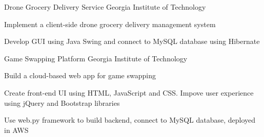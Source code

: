 


\begin{cventries}


	\compactcventry
	{Drone Grocery Delivery Service}
	{Georgia Institute of Technology} %
	{
		\begin{cvitems}
			\item{Implement a client-side drone grocery delivery management system}
			\item{Develop GUI using Java Swing and connect to MySQL database using Hibernate}
		\end{cvitems}
	}



	\compactcventry
	{Game Swapping Platform}
	{Georgia Institute of Technology} %
	{
		\begin{cvitems}
			\item{Build a cloud-based web app for game swapping}
			\item{Create front-end UI using HTML, JavaScript and CSS. Impove user experience using jQuery and Bootstrap libraries}
			\item{Use web.py framework to build backend, connect to MySQL database, deployed in AWS}
		\end{cvitems}
	}



\end{cventries}